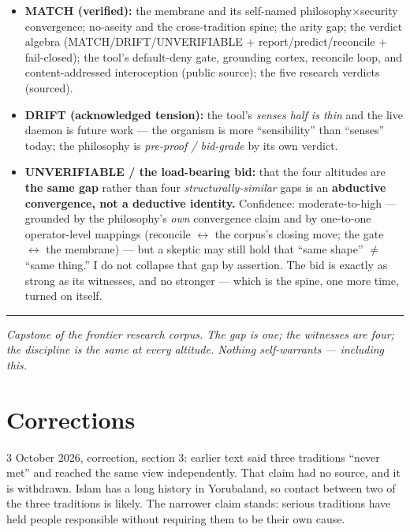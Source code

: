 \documentclass[11pt]{article}
\begin{document}
\begin{itemize}
\item \textbf{MATCH (verified):} the membrane and its self-named philosophy×security convergence; no-aseity and the cross-tradition spine; the arity gap; the verdict algebra (MATCH/\allowbreak{}DRIFT/\allowbreak{}UNVERIFIABLE + report/\allowbreak{}predict/\allowbreak{}reconcile + fail-closed); the tool's default-deny gate, grounding cortex, reconcile loop, and content-addressed interoception (public source); the five research verdicts (sourced).
\item \textbf{DRIFT (acknowledged tension):} the tool's \emph{senses half is thin} and the live daemon is future work — the organism is more ``sensibility'' than ``senses'' today; the philosophy is \emph{pre-proof /\allowbreak{} bid-grade} by its own verdict.
\item \textbf{UNVERIFIABLE /\allowbreak{} the load-bearing bid:} that the four altitudes are \textbf{the same gap} rather than four \emph{structurally-similar} gaps is an \textbf{abductive convergence, not a deductive identity.} Confidence: moderate-to-high — grounded by the philosophy's \emph{own} convergence claim and by one-to-one operator-level mappings (reconcile \ensuremath{\leftrightarrow} the corpus's closing move; the gate \ensuremath{\leftrightarrow} the membrane) — but a skeptic may still hold that ``same shape'' \ensuremath{\neq} ``same thing.'' I do not collapse that gap by assertion. The bid is exactly as strong as its witnesses, and no stronger — which is the spine, one more time, turned on itself.
\end{itemize}

\medskip\noindent\rule{\linewidth}{0.3pt}\medskip

\emph{Capstone of the frontier research corpus. The gap is one; the witnesses are four; the discipline is the same at every altitude. Nothing self-warrants — including this.}

\section*{Corrections}\label{corrections}

3 October 2026, correction, section 3: earlier text said three traditions ``never met'' and reached the same view independently. That claim had no source, and it is withdrawn. Islam has a long history in Yorubaland, so contact between two of the three traditions is likely. The narrower claim stands: serious traditions have held people responsible without requiring them to be their own cause.
\end{document}
